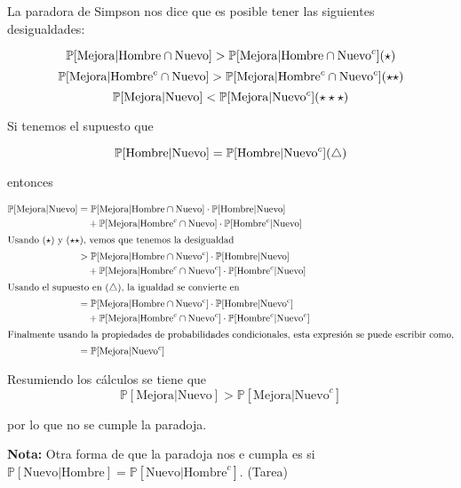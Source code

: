 \documentclass[
  12pt,
]{book}
\begin{document}
La paradora de Simpson nos dice que es posible tener las siguientes desigualdades:

\[\mathbb P[\text{Mejora}|\text{Hombre}\cap \text{Nuevo}]>\mathbb P[\text{Mejora}|\text{Hombre}\cap \text{Nuevo}^c] \hfill (\star)\]
\[\mathbb P[\text{Mejora}|\text{Hombre}^c\cap \text{Nuevo}]>\mathbb P[\text{Mejora}|\text{Hombre} ^c\cap \text{Nuevo}^c] \hfill (\star\star)\]
\[\mathbb P[\text{Mejora}|\text{Nuevo}]<\mathbb P[\text{Mejora}|\text{Nuevo}^c]\hfill (\star\star\star)\]

Si tenemos el supuesto que

\[
\mathbb P[\text{Hombre}|\text{Nuevo}] = \mathbb P[\text{Hombre}|\text{Nuevo}^c]\hfill (\triangle)
\]

entonces

\begin{align*} 
\mathbb P[\text{Mejora}|\text{Nuevo}]
& =
\mathbb P[\text{Mejora}|\text{Hombre} \cap \text{Nuevo}] \cdot \mathbb
P[\text{Hombre}|\text{Nuevo}] \\
& \quad + \mathbb P[\text{Mejora}|\text{Hombre}^c \cap \text{Nuevo}] \cdot \mathbb
P[\text{Hombre}^c|\text{Nuevo}] \\
\intertext{Usando $(\star)$ y $(\star\star)$, vemos que tenemos la desigualdad}
& > \mathbb P[\text{Mejora}|\text{Hombre}\cap
        \text{Nuevo}^c] \cdot \mathbb P[\text{Hombre}|\text{Nuevo}] \\
& \quad + \mathbb P[\text{Mejora}|\text{Hombre}^c\cap\text{Nuevo}^c] \cdot \mathbb P[\text{Hombre}^c|\text{Nuevo}]\\
\intertext{Usando el supuesto en ($\triangle$), la igualdad se convierte en}
& = \mathbb P[\text{Mejora}|\text{Hombre}\cap \text{Nuevo}^c] \cdot \mathbb
P[\text{Hombre}|\text{Nuevo}^c] \\
& \quad + \mathbb P[\text{Mejora}|\text{Hombre}^c\cap \text{Nuevo}^c] \cdot
\mathbb P[\text{Hombre}^c|\text{Nuevo}^c] \\
\intertext{Finalmente usando la propiedades de probabilidades condicionales, esta expresión se puede escribir como,}
& = \mathbb
P[\text{Mejora}|\text{Nuevo}^c] 
\end{align*}

Resumiendo los cálculos se tiene que
\[
\mathbb P[\text{Mejora}|\text{Nuevo}] > \mathbb P[\text{Mejora}|\text{Nuevo}^{c}]
\]

por lo que no se cumple la paradoja.

\textbf{Nota:} Otra forma de que la paradoja nos e cumpla es si \(\mathbb{P}[\text{Nuevo}|\text{Hombre}] = \mathbb{P}[\text{Nuevo}|\text{Hombre}^{c}]\). (Tarea)
\end{document}
